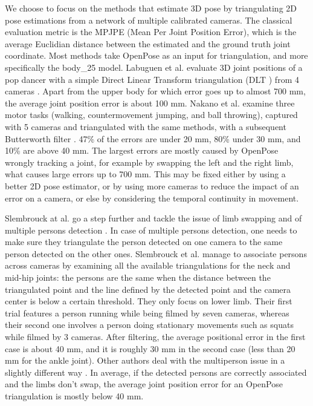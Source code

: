 We choose to focus on the methods that estimate 3D pose by triangulating 2D pose estimations from a network of multiple calibrated cameras. The classical evaluation metric is the MPJPE (Mean Per Joint Position Error), which is the average Euclidian distance between the estimated and the ground truth joint coordinate. Most methods take OpenPose as an input for triangulation, and more specifically the body\_25 model. Labuguen et al. evaluate 3D joint positions of a pop dancer with a simple Direct Linear Transform triangulation (DLT \cite{Hartley1997,Miller1980}) from 4 cameras \cite{Labuguen2020}. Apart from the upper body for which error goes up to almost 700 mm, the average joint position error is about 100 mm. Nakano et al. examine three motor tasks (walking, countermovement jumping, and ball throwing), captured with 5 cameras and triangulated with the same methods, with a subsequent Butterworth filter \cite{Nakano2019}. 47\% of the errors are under 20 mm, 80\% under 30 mm, and 10\% are above 40 mm. The largest errors are mostly caused by OpenPose wrongly tracking a joint, for example by swapping the left and the right limb, what causes large errors up to 700 mm. This may be fixed either by using a better 2D pose estimator, or by using more cameras to reduce the impact of an error on a camera, or else by considering the temporal continuity in movement. 

Slembrouck at al. go a step further and tackle the issue of limb swapping and of multiple persons detection \cite{Slembrouck2020}. In case of multiple persons detection, one needs to make sure they triangulate the person detected on one camera to the same person detected on the other ones. Slembrouck et al. manage to associate persons across cameras by examining all the available triangulations for the neck and mid-hip joints: the persons are the same when the distance between the triangulated point and the line defined by the detected point and the camera center is below a certain threshold. They only focus on lower limb. Their first trial features a person running while being filmed by seven cameras, whereas their second one involves a person doing stationary movements such as squats while filmed by 3 cameras. After filtering, the average positional error in the first case is about 40 mm, and it is roughly 30 mm in the second case (less than 20 mm for the ankle joint). Other authors deal with the multiperson issue in a slightly different way \cite{Bridgeman2019,Chu2021,Dong2019}. In average, if the detected persons are correctly associated and the limbs don’t swap, the average joint position error for an OpenPose triangulation is mostly below 40 mm.

